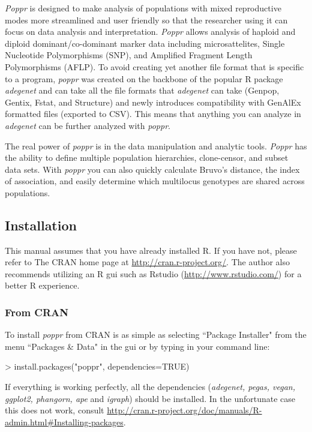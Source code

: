 \documentclass[letterpaper]{article}
\newcommand{\tab}{\hspace*{1em}}
\begin{document}
\textit{Poppr} is designed to make analysis of populations with mixed reproductive modes more streamlined and user friendly so that the researcher using it can focus on data analysis and interpretation. \textit{Poppr} allows analysis of haploid and diploid dominant/co-dominant marker data including microsattelites, Single Nucleotide Polymorphisms (SNP), and Amplified Fragment Length Polymorphisms (AFLP). To avoid creating yet another file format that is specific to a program, \textit{poppr} was created on the backbone of the popular R package \textit{adegenet} and can take all the file formats that \textit{adegenet} can take (Genpop, Gentix, Fstat, and Structure) and newly introduces compatibility with GenAlEx formatted files (exported to CSV). This means that anything you can analyze in \textit{adegenet} can be further analyzed with \textit{poppr}.

The real power of \textit{poppr} is in the data manipulation and analytic tools. \textit{Poppr} has the ability to define multiple population hierarchies, clone-censor, and subset data sets. With \textit{poppr} you can also quickly calculate Bruvo's distance, the index of association, and easily determine which multilocus genotypes are shared across populations.
\subsection{Installation}\label{intro:install}

\tab\tab This manual assumes that you have already installed R. If you have not, please refer to The CRAN home page at \url{http://cran.r-project.org/}. The author also recommends utilizing an R gui such as Rstudio (\url{http://www.rstudio.com/}) for a better R experience. 

\subsubsection{From CRAN}
\tab\tab To install \textit{poppr} from CRAN is as simple as selecting ``Package Installer" from the menu ``Packages \& Data" in the gui or by typing in your command line:
\begin{Schunk}
\begin{Sinput}
> install.packages("poppr", dependencies=TRUE)
\end{Sinput}
\end{Schunk}
If everything is working perfectly, all the dependencies (\textit{adegenet, pegas, vegan, ggplot2, phangorn, ape} and \textit{igraph}) should be installed. In the unfortunate case this does not work, consult \url{http://cran.r-project.org/doc/manuals/R-admin.html#Installing-packages}.
\end{document}
